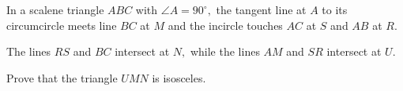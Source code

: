 In a scalene triangle $ABC$ with $\angle A = 90^\circ,$ the tangent line at $A$ to its circumcircle meets line $BC$ at $M$ and the incircle touches $AC$ at $S$ and $AB$ at $R.$

The lines $RS$ and $BC$ intersect at $N,$ while the lines $AM$ and $SR$ intersect at $U.$

Prove that the triangle $UMN$ is isosceles.